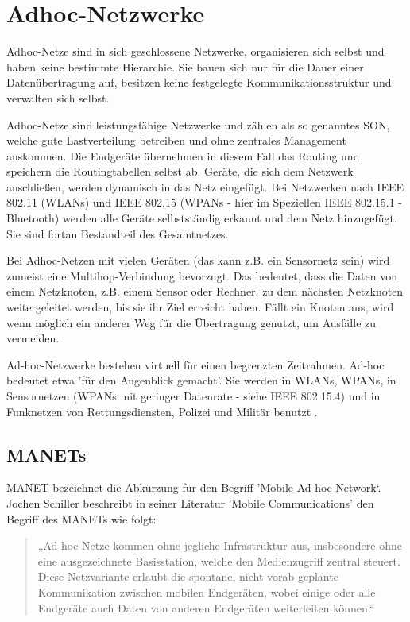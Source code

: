 \section{Adhoc-Netzwerke}\label{s:AdhocNetzwerke}

Adhoc-Netze sind in sich geschlossene Netzwerke, organisieren sich selbst und haben keine bestimmte Hierarchie. Sie bauen sich nur für die Dauer einer Datenübertragung auf, besitzen keine festgelegte Kommunikationsstruktur und verwalten sich selbst. 

Adhoc-Netze sind leistungsfähige Netzwerke und zählen als so genanntes \ac{SON}, welche gute Lastverteilung betreiben und ohne zentrales Management auskommen. Die Endgeräte übernehmen in diesem Fall das Routing und speichern die Routingtabellen selbst ab. Geräte, die sich dem Netzwerk anschließen, werden dynamisch in das Netz eingefügt. Bei Netzwerken nach IEEE 802.11 (WLANs) und IEEE 802.15 (WPANs - hier im Speziellen IEEE 802.15.1 - Bluetooth) werden alle Geräte selbstständig erkannt und dem Netz hinzugefügt. Sie sind fortan Bestandteil des Gesamtnetzes. 

Bei Adhoc-Netzen mit vielen Geräten (das kann z.B. ein Sensornetz sein) wird zumeist eine Multihop-Verbindung bevorzugt. Das bedeutet, dass die Daten von einem Netzknoten, z.B. einem Sensor oder Rechner, zu dem nächsten Netzknoten weitergeleitet werden, bis sie ihr Ziel erreicht haben. Fällt ein Knoten aus, wird wenn möglich ein anderer Weg für die Übertragung genutzt, um Ausfälle zu vermeiden.

Ad-hoc-Netzwerke bestehen virtuell für einen begrenzten Zeitrahmen. Ad-hoc bedeutet etwa 'für den Augenblick gemacht'. Sie werden in WLANs, WPANs, in Sensornetzen (WPANs mit geringer Datenrate - siehe IEEE 802.15.4) und in Funknetzen von Rettungsdiensten, Polizei und Militär benutzt \cite{ws:lipinski}.

\subsection{MANETs}\label{ss:MANETs}

MANET bezeichnet die Abkürzung für den Begriff 'Mobile Ad-hoc Network‘. Jochen Schiller beschreibt in seiner Literatur 'Mobile Communications' den Begriff des MANETs wie folgt:
 
\begin{quote}
„Ad-hoc-Netze kommen ohne jegliche Infrastruktur aus, insbesondere ohne eine ausgezeichnete Basisstation, welche den Medienzugriff zentral steuert. Diese Netzvariante erlaubt die spontane, nicht vorab geplante Kommunikation zwischen mobilen Endgeräten, wobei einige oder alle Endgeräte auch Daten von anderen Endgeräten weiterleiten können.“
\end{quote}
	
